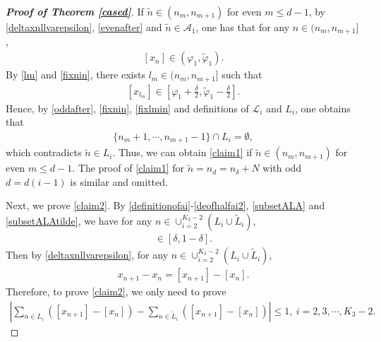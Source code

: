 \documentclass[12pt]{amsart}
\newcommand{\abs}[1]{\left\lvert #1 \right\rvert}
\theoremstyle{plain}
\theoremstyle{definition}
\begin{document}
\begin{proof}[\textbf{Proof of Theorem \ref{cased}}]
If $\tilde{n}\in(n_{m},n_{m+1})$ for even $m\leq d-1$,
 by \eqref{deltaxnllvarepsilon}, \eqref{evenafter} and $\tilde{n}\in\mathcal{A}_1$, one has that for any ${n}\in(n_{m},n_{m+1}]$, 
\begin{align}
\left[x_n\right]\in (\varphi_1,\tilde{\varphi}_1).\label{fixnin}
\end{align}
By \eqref{lm} and \eqref{fixnin}, there exists $l_m\in(n_{m},n_{m+1}]$ such that 
\begin{align}
\left[x_{{l_{m}}}\right]\in \left[\varphi_1+\frac{\delta}{2},\tilde{\varphi}_1-\frac{\delta}{2}\right].\label{fixlmin}
\end{align}
Hence, by \eqref{oddafter}, \eqref{fixnin}, \eqref{fixlmin} and definitions of $\mathcal{L}_i$ and $L_i$, one obtains that 
\begin{align}
\{n_{m}+1,\cdots,n_{m+1}-1\}\cap L_i=\emptyset,\nonumber
\end{align}
which contradicts $\tilde{n}\in L_i$.
 Thus, we can obtain \eqref{claim1} if $\tilde{n}\in(n_{m},n_{m+1})$ for even $m\leq d-1$.
The proof of \eqref{claim1} for $\tilde{n}=n_d=n_{\delta}+N$ with odd $d=d(i-1)$ is similar and omitted.

Next, we prove \eqref{claim2}.
By \eqref{definitionofai}-\eqref{deofhalfai2}, \eqref{subsetALA} and \eqref{subsetALAtilde}, we have for any $n\in \cup_{i=2}^{K_3-2}\left(L_i\cup \tilde{L}_i\right)$,
\begin{align}
	[x_n]\in \left[\delta,1-\delta\right].\nonumber
\end{align}
Then by \eqref{deltaxnllvarepsilon}, for any $n\in \cup_{i=2}^{K_3-2}\left(L_i\cup \tilde{L}_i\right)$,
\begin{align}
	x_{n+1}-x_n=[x_{n+1}]-[x_n].\label{xn1xne}
\end{align}
Therefore, to prove \eqref{claim2}, we only need to prove 
\begin{align}
\label{fitopr}	\abs{\sum_{n\in L_i}(\left[x_{n+1}\right]-\left[x_n\right])-\sum_{n\in \tilde{L}_i}(\left[x_{n+1}\right]-\left[x_n\right])}\leq 1, \ i=2,3,\cdots,K_3-2.
\end{align}



\end{proof}
\end{document}
